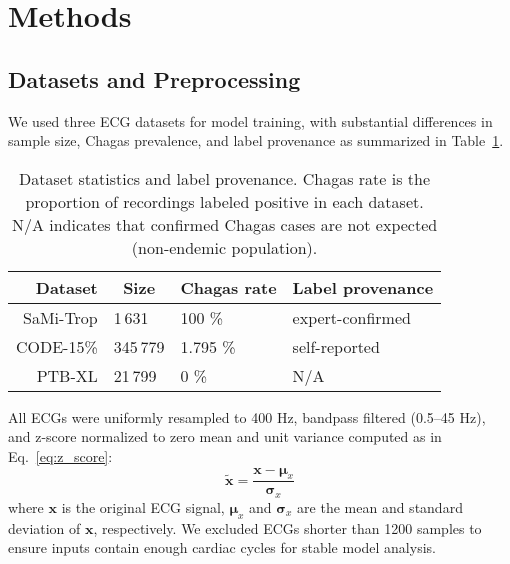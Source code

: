 \documentclass[twocolumn]{cinc}
\begin{document}
\section{Methods}
\label{sec:methods}


\subsection{Datasets and Preprocessing}
\label{subsec:data}


We used three ECG datasets for model training, with substantial differences in sample size, Chagas prevalence, and label provenance as summarized in Table~\ref{tab:dataset_stats}.

\setlength{\tabcolsep}{4pt} %
\begin{table}[!htp]
\centering
\begin{tabular}{rlll}
\toprule
Dataset & \multicolumn{1}{c}{Size} & \multicolumn{1}{c}{Chagas rate} & Label provenance \\
\midrule
SaMi-Trop   & 1\,631     & 100 \%    & expert-confirmed \\
CODE-15\%   & 345\,779   & 1.795 \%  & self-reported \\
PTB-XL      & 21\,799    & 0 \%      & N/A \\
\bottomrule
\end{tabular}
\caption{Dataset statistics and label provenance. Chagas rate is the proportion of recordings labeled positive in each dataset. N/A indicates that confirmed Chagas cases are not expected (non-endemic population).}
\label{tab:dataset_stats}
\end{table}
\setlength{\tabcolsep}{6pt} %

All ECGs were uniformly resampled to 400 Hz, bandpass filtered (0.5–45 Hz), and z-score normalized to zero mean and unit variance computed as in Eq.~\ref{eq:z_score}:
\begin{equation}
\label{eq:z_score}
\tilde{\mathbf{x}} = \frac{\mathbf{x} - \boldsymbol{\mu}_x}{\boldsymbol{\sigma}_x}
\end{equation}
where $\mathbf{x}$ is the original ECG signal, $\boldsymbol{\mu}_x$ and $\boldsymbol{\sigma}_x$ are the mean and standard deviation of $\mathbf{x}$, respectively. We excluded ECGs shorter than 1200 samples to ensure inputs contain enough cardiac cycles for stable model analysis.
\end{document}
